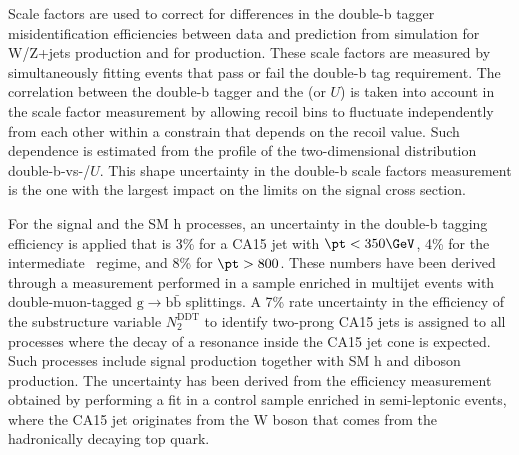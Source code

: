 Scale factors are used to correct for differences in the double-b tagger misidentification efficiencies between data and prediction from simulation for W/Z+jets production and for \ttbar production. These scale factors are measured by simultaneously fitting events that pass or fail the double-b tag requirement. The correlation between the double-b tagger and the \ptmiss (or $U$) is taken into account in the scale factor measurement by allowing recoil bins to fluctuate independently from each other within a constrain that depends on the recoil value. Such dependence is estimated from the profile of the two-dimensional distribution double-b-vs-\ptmiss/$U$. This shape uncertainty in the double-b scale factors measurement is the one with the largest impact on the limits on the signal cross section.

For the signal and the SM h processes, an uncertainty in the double-b tagging efficiency is applied that is 3\% for a CA15 jet with $\pt<350\GeV$, 4\% for the intermediate \pt~regime, and 8\% for $\pt>800$\GeV. These numbers have been derived through a measurement performed in a sample enriched in multijet events with double-muon-tagged $\text{g}\to\text{b}\bar{\text{b}}$ splittings. A 7\% rate uncertainty in the efficiency of the substructure variable $N_2^\text{DDT}$ to identify two-prong CA15 jets is assigned to all processes where the decay of a resonance inside the CA15 jet cone is expected. Such processes include signal production together with SM h and diboson production. The uncertainty has been derived from the efficiency measurement obtained by performing a fit in a control sample enriched in semi-leptonic \ttbar events, where the CA15 jet originates from the W boson that comes from the hadronically decaying top quark. 


